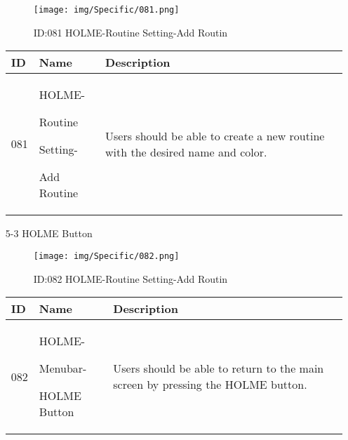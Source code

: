 \documentclass[conference]{IEEEtran}
\begin{document}
\begin{enumerate}
\begin{figure}[h]
\centering                                         
\texttt{[image: img/Specific/081.png]}
\caption{ID:081 HOLME-Routine Setting-Add Routin}
\end{figure}
\begin{table}[h]
\def\arraystretch{1.2} \small
    \begin{tabular}{|p{1cm}|p{1.8cm}|p{5.0cm}|}
        \hline
        ID & Name & Description\\ \hline
         081 \par  & HOLME-\par Routine \par Setting- \par Add Routine & 
         Users should be able to create a new routine with the desired name and color.
         \\ \hline
    \end{tabular}
\end{table}
\vspace{3cm}
\item[5-3] HOLME Button \\
\begin{figure}[h]
\centering                                         
\texttt{[image: img/Specific/082.png]}
\caption{ID:082 HOLME-Routine Setting-Add Routin}
\end{figure}
\begin{table}[h]
\def\arraystretch{1.2} \small
    \begin{tabular}{|p{1cm}|p{1.8cm}|p{5.0cm}|}
        \hline
        ID & Name & Description\\ \hline
         082 \par  & HOLME-\par Menubar- \par HOLME Button & 
         Users should be able to return to the main screen by pressing the HOLME button.
         \\ \hline
    \end{tabular}
\end{table}


\end{enumerate}
\end{document}
